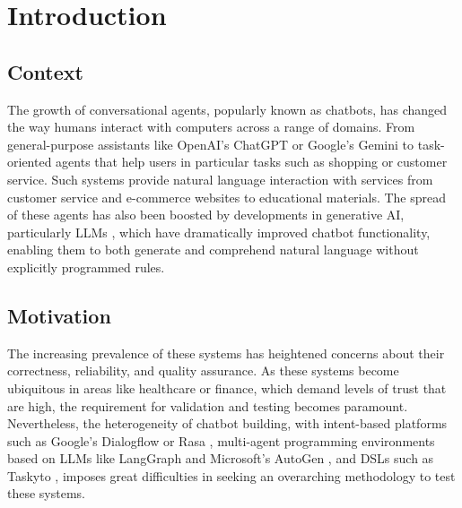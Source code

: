 
\chapter{Introduction}\label{chapter:introduction}

\section{Context}

The growth of conversational agents, popularly known as chatbots,
has changed the way humans interact with computers across a range of domains.
From general-purpose assistants like OpenAI's ChatGPT \autocite{ChatGPT} or Google's Gemini \autocite{GoogleGemini} to task-oriented agents that help users in particular tasks such as shopping or customer service.
Such systems provide natural language interaction with services from customer service and e-commerce websites to educational materials.
The spread of these agents has also been boosted by developments in generative \ac{AI}, particularly \acp{LLM} \autocite{minaeeLargeLanguageModels2025}, which have dramatically improved chatbot functionality, enabling them to both generate and comprehend natural language without explicitly programmed rules.

\section{Motivation}

The increasing prevalence of these systems has heightened concerns about their correctness, reliability, and quality assurance.
As these systems become ubiquitous in areas like healthcare or finance, which demand levels of trust that are high, the requirement for validation and testing becomes paramount.
Nevertheless, the heterogeneity of chatbot building, with intent-based platforms such as Google's Dialogflow \autocite{Dialogflow} or Rasa \autocite{Rasa2020}, multi-agent programming environments based on \acp{LLM} like LangGraph \autocite{LangGraph} and Microsoft's AutoGen \autocite{AutoGen}, and \acp{DSL} such as Taskyto \autocite{sanchezcuadradoAutomatingDevelopmentTaskoriented2024}, imposes great difficulties in seeking an overarching methodology to test these systems.


